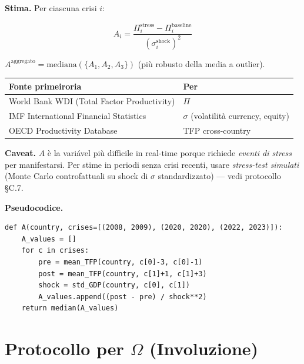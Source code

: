\Hypoth{} \textbf{Stima.} Per ciascuna crisi \(i\):

\[
A_i = \frac{\Pi^{\text{stress}}_i - \Pi^{\text{baseline}}_i}{(\sigma^{\text{shock}}_i)^2}
\]

\(A^{\text{aggregato}} = \text{mediana}(\{A_1, A_2, A_3\})\) (più
robusto della media a outlier).

{\def\LTcaptype{none} %
{\small\begin{longtable}[]{@{}
  >{\raggedright\arraybackslash}p{}
  >{\raggedright\arraybackslash}p{}@{}}
\toprule\noalign{}
\begin{minipage}[b]{\linewidth}\raggedright
Fonte primeiroria
\end{minipage} & \begin{minipage}[b]{\linewidth}\raggedright
Per
\end{minipage} \\
\midrule\noalign{}
\endhead
\bottomrule\noalign{}
\endlastfoot
World Bank WDI (Total Factor Productivity) & \(\Pi\) \\
IMF International Financial Statistics & \(\sigma\) (volatilità
currency, equity) \\
OECD Productivity Database & TFP cross-country \\
\end{longtable}}
}

\Conj{} \textbf{Caveat.} \(A\) è la variável più difficile in real-time
porque richiede \emph{eventi di stress} per manifestarsi. Per stime in
periodi senza crisi recenti, usare \emph{stress-test simulati} (Monte
Carlo controfattuali su shock di \(\sigma\) standardizzato) --- vedi
protocollo \S{}C.7.

\Hypoth{} \textbf{Pseudocodice.}

\begin{verbatim}
def A(country, crises=[(2008, 2009), (2020, 2020), (2022, 2023)]):
    A_values = []
    for c in crises:
        pre = mean_TFP(country, c[0]-3, c[0]-1)
        post = mean_TFP(country, c[1]+1, c[1]+3)
        shock = std_GDP(country, c[0], c[1])
        A_values.append((post - pre) / shock**2)
    return median(A_values)
\end{verbatim}



\section{\texorpdfstring{Protocollo per \(\Omega\)
(Involuzione)}{Protocollo per \textbackslash Omega (Involuzione)}}\label{protocollo-per-omega-involução}

